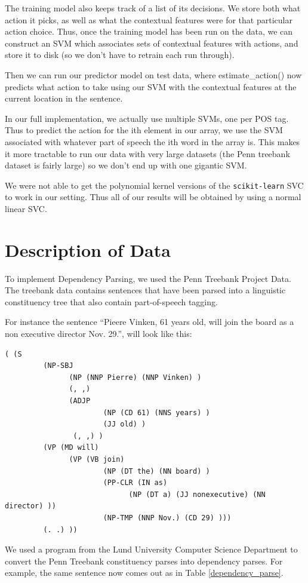 \documentclass[12pt]{amsart}
\begin{document}
The training model also keeps track of a list of its decisions. We store both
what action it picks, as well as what the contextual features were for that
particular action choice. Thus, once the training model has been run on the
data, we can construct an SVM which associates sets of contextual features 
with actions, and store it to disk (so we don't have to retrain each run
through).

Then we can run our predictor model on test data, where estimate\_action()
now predicts what action to take using our SVM with the contextual
features at the current location in the sentence.

In our full implementation, we actually use multiple SVMs, one per POS tag.
Thus to predict the action for the ith element in our array, we use the SVM
associated with whatever part of speech the ith word in the array is. This
makes it more tractable to run our data with very large datasets (the Penn
treebank dataset is fairly large) so we don't end up with one gigantic SVM.

We were not able to get the polynomial kernel versions of the \texttt{scikit-learn} SVC to work in our setting. Thus all of our results will be obtained by using a normal linear SVC.
\section{Description of Data}
To implement Dependency Parsing, we used the Penn Treebank Project Data. The treebank data contains sentences that have been parsed into a linguistic constituency tree that also contain part-of-speech tagging.

For instance the sentence ``Pieere Vinken, 61 years old, will join the board as a non executive director Nov. 29.'', will look like this: 
\begin{verbatim}
( (S
         (NP-SBJ 
               (NP (NNP Pierre) (NNP Vinken) )
               (, ,) 
               (ADJP
                       (NP (CD 61) (NNS years) )
                       (JJ old) )
                (, ,) )
         (VP (MD will) 
               (VP (VB join) 
                       (NP (DT the) (NN board) )
                       (PP-CLR (IN as) 
                             (NP (DT a) (JJ nonexecutive) (NN director) ))
                       (NP-TMP (NNP Nov.) (CD 29) )))
         (. .) ))
\end{verbatim}

We used a program from the Lund University Computer Science Department to convert the Penn Treebank constituency parses into dependency parses. For example, the same sentence now comes out as in Table \ref{dependency_parse}.
\end{document}
